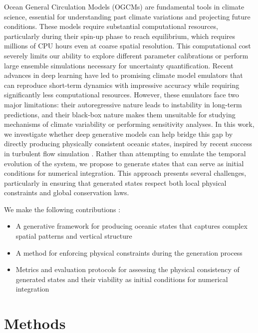 \documentclass{article}
\begin{document}
Ocean General Circulation Models (OGCMs) are fundamental tools in climate science, essential for understanding past climate variations and projecting future conditions.
These models require substantial computational resources, particularly during their spin-up phase to reach equilibrium, which requires
millions of CPU hours even at coarse spatial resolution.
This computational cost severely limits our ability to explore different parameter calibrations or perform large ensemble simulations necessary for uncertainty quantification.
Recent advances in deep learning have led to promising climate model emulators \citep{xihe2024, aouni2024glonetmercatorsendtoendneural, Kochkov_2024, ace2023} that can reproduce short-term dynamics with impressive accuracy while requiring significantly less computational resources. However, these emulators face two major limitations: their autoregressive nature leads to instability in long-term predictions, and their black-box nature makes them unsuitable for studying mechanisms of climate variability or performing sensitivity analyses.
In this work, we investigate whether deep generative models can help bridge this gap by directly producing physically consistent oceanic states, inspired by recent success in turbulent flow simulation \citep{yang2023zero}. Rather than attempting to emulate the temporal evolution of the system, we propose to generate states that can serve as initial conditions for numerical integration. This approach presents several challenges, particularly in ensuring that generated states respect both local physical constraints and global conservation laws.

We make the following contributions :
\begin{itemize}
    \item A generative framework for producing oceanic states that captures complex spatial patterns and vertical structure
    \item A method for enforcing physical constraints during the generation process
    \item Metrics and evaluation protocols for assessing the physical consistency of generated states and their viability as initial conditions for numerical integration
\end{itemize}




\section{Methods}
\end{document}
